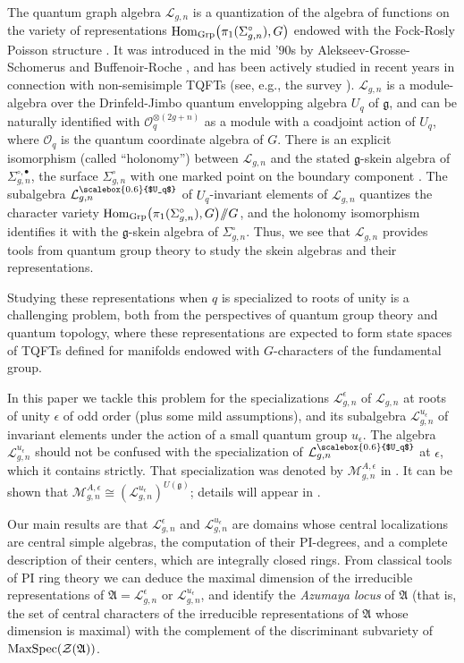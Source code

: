 \documentclass[11pt]{amsart}
\newcommand{\e}{\epsilon}
\newcommand{\Ll}{\mathcal{L}}
\newcommand{\Oo}{\mathcal{O}}
\begin{document}
The quantum graph algebra $\Ll_{g,n}$ is a quantization of the algebra of functions on the variety of representations ${\rm Hom}_{\rm Grp}\bigl(\pi_1(\Sigma_{g,n}^{\circ}),G\bigr)$ endowed with the Fock-Rosly Poisson structure \cite{FR}. It was introduced in the mid '$90$s by Alekseev-Grosse-Schomerus \cite{Al, AGS1,AGS2,AS} and Buffenoir-Roche \cite{BuR1,BuR2}, and has been actively studied in recent years in connection with non-semisimple TQFTs (see, e.g., the survey \cite{JordanSurvey}). $\Ll_{g,n}$ is a module-algebra over the Drinfeld-Jimbo quantum envelopping algebra $U_q$ of $\mathfrak{g}$, and can be naturally identified with $\Oo_q^{\otimes (2g+n)}$ as a module with a coadjoint action of $U_q$, where $\Oo_q$ is the quantum coordinate algebra of $G$.  There is an explicit isomorphism (called ``holonomy'') between $\Ll_{g,n}$ and the stated $\mathfrak{g}$-skein algebra of $\Sigma_{g,n}^{\circ,\bullet}$, the surface $\Sigma_{g,n}^{\circ}$ with one marked point on the boundary component \cite{BFR, FaitgHol}. The subalgebra $\Ll_{g,n}^{{\scalebox{0.6}{$U_q$}}}$ of $U_q$-invariant elements of $\Ll_{g,n}$ quantizes the character variety ${\rm Hom}_{\rm Grp}\bigl(\pi_1(\Sigma_{g,n}^{\circ}),G\bigr)/\!\!/ G$, and the holonomy isomorphism identifies it with the $\mathfrak{g}$-skein algebra of $\Sigma_{g,n}^{\circ}$. Thus, we see that $\Ll_{g,n}$ provides tools from quantum group theory to study the skein algebras and their representations.  

Studying these representations when $q$ is specialized to roots of unity is a challenging problem, both from the perspectives of quantum group theory and quantum topology, where these representations are expected to form state spaces of TQFTs defined for manifolds endowed with $G$-characters of the fundamental group.

In this paper we tackle this problem for the specializations $\Ll_{g,n}^{\e}$ of $\Ll_{g,n}$ at roots of unity $\e$ of odd order (plus some mild assumptions), and its subalgebra $\Ll_{g,n}^{u_\e}$ of invariant elements under the action of a small quantum group $u_\e$. The algebra $\Ll_{g,n}^{u_\e}$ should not be confused with the specialization of $\Ll_{g,n}^{{\scalebox{0.6}{$U_q$}}}$ at $\e$, which it contains strictly. That specialization was denoted by $\mathcal{M}_{g,n}^{A,\e}$ in \cite{BR2}. It can be shown that $\mathcal{M}_{g,n}^{A,\e} \cong (\mathcal{L}_{g,n}^{u_\e})^{U(\mathfrak{g})}$; details will appear in \cite{BF}.

\smallskip

Our main results are that $\Ll_{g,n}^{\e}$ and $\Ll_{g,n}^{u_\e}$ are domains whose central localizations are central simple algebras, the computation of their PI-degrees, and a complete description of their centers, which are integrally closed rings. From classical tools of PI ring theory we can deduce the maximal dimension of the irreducible representations of $\mathfrak{A} =\Ll_{g,n}^{\e}$ or $\Ll_{g,n}^{u_\e}$, and identify the {\it Azumaya locus} of $\mathfrak{A}$ (that is, the set of central characters of the irreducible representations of $\mathfrak{A}$ whose dimension is maximal) with the complement of the discriminant subvariety of ${\rm MaxSpec}(\mathcal{Z}(\mathfrak{A}))$.
\end{document}
